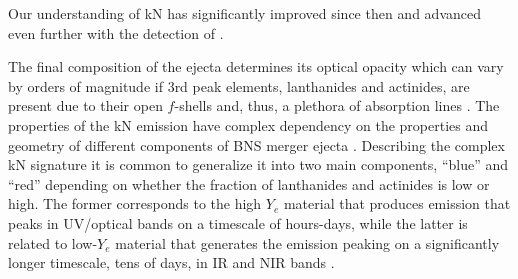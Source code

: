 %
Our understanding of \ac{kN} has significantly improved since then
\citep[\eg][]{Kulkarni:2005jw,Metzger:2010,Roberts:2011,Metzger:2016pju,Wollaeger:2017ahm} 
and advanced even further with the detection of \AT{} \citep[\eg][]{Metzger:2019zeh}.

The final composition of the ejecta determines its optical opacity 
which can vary by orders of magnitude if $3$rd peak elements, 
lanthanides 
and actinides, 
are present 
due to their open $f$-shells and, thus, a plethora of 
absorption lines \citep{Tanaka:2013ana,Kasen:2013xka}.
%
The properties of the \ac{kN} emission have complex 
dependency on the properties and geometry of different components of 
\ac{BNS} merger ejecta \citep{Metzger:2019zeh}.
%
Describing the complex \ac{kN} signature it is common to 
generalize it into two main components, ``blue'' and ``red'' 
depending on whether the fraction of lanthanides and actinides is low or high.
%
The former corresponds to the high $Y_e$ material that produces emission 
that peaks in \ac{UV}/optical bands on a timescale of hours-days, 
while the latter is related to low-$Y_e$ material that generates the 
emission peaking on a significantly 
longer timescale, tens of days, in \ac{IR} and \ac{NIR} bands
\citep{Barnes:2013wka,Grossman:2013lqa,Lippuner:2015gwa}.

